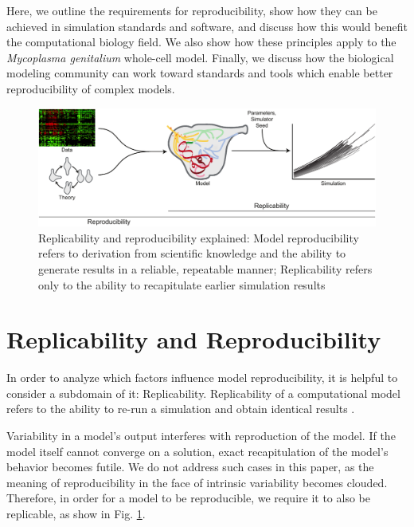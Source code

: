 \documentclass[journal,transmag,twoside]{IEEEtran}
\begin{document}
Here, we outline the requirements for reproducibility, show how they can
be achieved in simulation standards and software, and discuss how this would benefit
the computational biology field. We also show how these principles apply to the \textit{Mycoplasma genitalium} whole-cell
model.
Finally, we discuss how the biological modeling community can work toward standards
and tools which enable better reproducibility of complex models.

\begin{figure}[!t]
\centering
\includegraphics[width=\textwidth]{figure1/figure1}
\caption{Replicability and reproducibility explained: Model reproducibility refers to derivation from scientific knowledge and the ability to generate results in a reliable, repeatable manner;
Replicability refers only to the ability to recapitulate earlier simulation results}
\label{fig_repro_diagram}
\end{figure}

\section{Replicability and Reproducibility}

In order to analyze which factors influence model reproducibility,
it is helpful to consider a subdomain of it: Replicability.
Replicability of a computational model refers to the ability to
re-run a simulation and obtain identical results \cite{easterbrook2014open}.

Variability in a model's output interferes with reproduction of the model.
If the model itself cannot converge on a solution, exact recapitulation of the model's behavior
becomes futile. %
We do not address such cases in this paper, as the meaning of reproducibility in the face
of intrinsic variability becomes clouded.
Therefore, in order for a model to be reproducible, we require it to also be replicable,
as show in Fig. \ref{fig_repro_diagram}.
\end{document}
